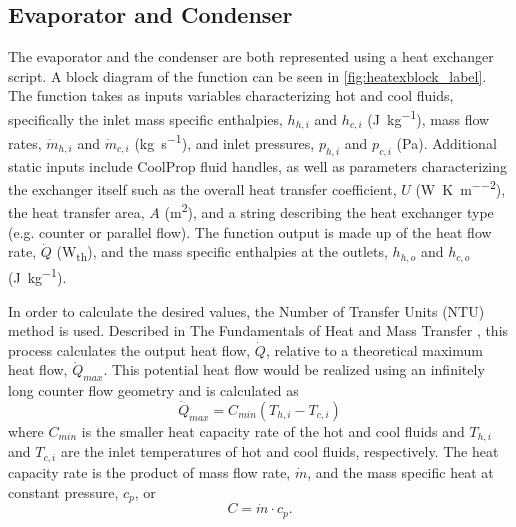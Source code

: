 \subsection{Evaporator and Condenser}
\label{sec:heatex}
The evaporator and the condenser are both represented using a heat exchanger script.  A block diagram of the function can be seen in \autoref{fig:heatexblock_label}. The function takes as inputs variables characterizing hot and cool fluids, specifically the inlet mass specific enthalpies, $h_{h,i}$ and $h_{c,i}$ (\si{\joule\per\kilogram}), mass flow rates, $\dot{m}_{h,i}$ and $\dot{m}_{c,i}$ (\si{\kilogram\per\second}), and inlet pressures, $p_{h,i}$ and $p_{c,i}$ (\si{\pascal}). Additional static inputs include CoolProp\textsuperscript{\textcopyright} fluid handles, as well as parameters characterizing the exchanger itself such as the overall heat transfer coefficient, $U$ (\si{\watt\per\kelvin\per\meter\squared}), the heat transfer area, $A$ (\si{\meter\squared}), and a string describing the heat exchanger type (e.g. counter or parallel flow). The function output is made up of the heat flow rate, $\dot{Q}$ (\si{\watt}\textsubscript{th}), and the mass specific enthalpies at the outlets, $h_{h,o}$ and $h_{c,o}$ (\si{\joule\per\kilogram}). 


In order to calculate the desired values, the Number of Transfer Units (NTU) method is used. Described in The Fundamentals of Heat and Mass Transfer \cite{Incropera}, this process calculates the output heat flow, $\dot{Q}$, relative to a theoretical maximum heat flow, $\dot{Q}_{max}$. This potential heat flow would be realized using an infinitely long counter flow geometry and is calculated as
\begin{equation}
\dot{Q}_{max} = C_{min}\left(T_{h,i} - T_{c,i}\right)
\end{equation}
where $C_{min}$ is the smaller heat capacity rate of the hot and cool fluids and $T_{h,i}$ and $T_{c,i}$ are the inlet temperatures of hot and cool fluids, respectively. The heat capacity rate is the product of mass flow rate, $\dot{m}$, and the mass specific heat at constant pressure, $c_p$, or 
\begin{equation}
C = \dot{m} \cdot c_p. 
\end{equation}

